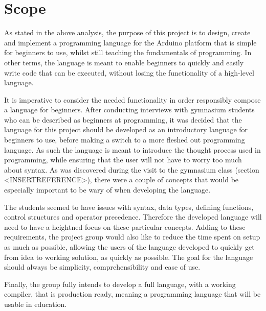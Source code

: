 \section{Scope}
As stated in the above analysis, the purpose of this project is to design, create and implement a
programming language for the Arduino platform that is simple for beginners to use, whilst still teaching the
fundamentals of programming.
In other terms, the language is meant to enable beginners to quickly and easily write
code that can be executed, without losing the functionality of a high-level language.

It is imperative to consider the needed functionality in order responsibly compose a language for
beginners.
After conducting interviews with gymnasium students who can be described as beginners at programming,
it was decided that the language for this project should be developed as an introductory language for beginners to use, before making a switch to a more fleshed out programming language.
As such the language is meant to introduce the thought process used in programming, while ensuring that the user will not have to worry too much about syntax.
As was discovered during the visit to the gymnasium class (section <INSERTREFERENCE>), there were a couple of concepts that would be especially important to be wary of when developing the language.

The students seemed to have issues with syntax, data types, defining functions, control structures and operator precedence.
Therefore the developed language will need to have a heightned focus on these particular concepts. 
Adding to these requirements, the project group would also like to reduce the time spent on setup as much as possible, allowing the users of the language developed to quickly get from idea to working solution, as quickly as possible.
The goal for the language should always be simplicity, comprehensibility and ease of use.

Finally, the group fully intends to develop a full language, with a working compiler, that is production ready, meaning a programming language that will be usable in education.

